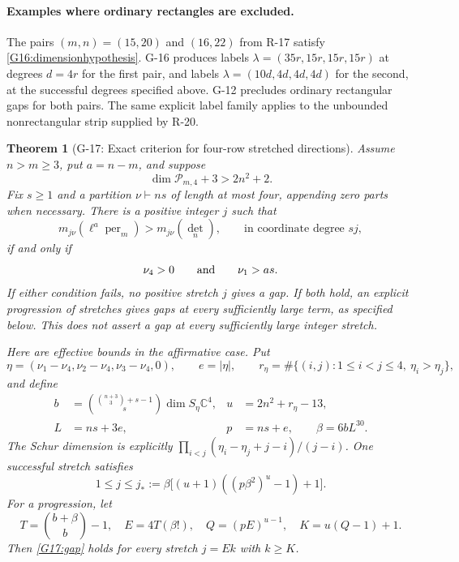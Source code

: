\documentclass[11pt,a4paper]{article}
\newtheorem{theorem}{Theorem}
\theoremstyle{definition}\newtheorem{definition}{Definition}
\begin{document}
\paragraph{Examples where ordinary rectangles are excluded.}
The pairs $(m,n)=(15,20)$ and $(16,22)$ from R-17 satisfy
\eqref{G16:dimensionhypothesis}. G-16 produces labels
$\lambda=(35r,15r,15r,15r)$ at degrees $d=4r$ for the first pair,
and labels $\lambda=(10d,4d,4d,4d)$ for the second, at the
successful degrees specified above. G-12 precludes ordinary
rectangular gaps for both pairs. The same explicit label family
applies to the unbounded nonrectangular strip supplied by R-20.


\begin{theorem}[G-17: Exact criterion for four-row stretched directions]\label{G-17}
Assume $n>m\geq3$, put $a=n-m$, and suppose
\[
 \dim\mathcal P_{m,4}+3>2n^2+2.
\]
Fix $s\geq1$ and a partition $\nu\vdash ns$ of length at most four,
appending zero parts when necessary. There is a positive integer $j$
such that
\begin{equation}\label{G17:gap}
 m_{j\nu}(\ell^a\operatorname{per}_m)>m_{j\nu}(\det_n),
 \qquad\text{in coordinate degree }sj,
\end{equation}
if and only if
\begin{equation}\label{G17:criterion}
 \nu_4>0\qquad\hbox{and}\qquad\nu_1>as.
\end{equation}
If either condition fails, no positive stretch $j$ gives a gap.
If both hold, an explicit progression of stretches gives gaps at
every sufficiently large term, as specified below. This does not
assert a gap at every sufficiently large integer stretch.

Here are effective bounds in the affirmative case. Put
\[
 \eta=(\nu_1-\nu_4,\nu_2-\nu_4,\nu_3-\nu_4,0),\qquad e=|\eta|,
 \qquad r_\eta=\#\{(i,j):1\leq i<j\leq4,\ \eta_i>\eta_j\},
\]
and define
\[
 \begin{aligned}
 b&=\binom{\binom{n+3}{3}+s-1}{s}\dim S_\eta\mathbb C^4,
 &u&=2n^2+r_\eta-13,\\
 L&=ns+3e,&p&=ns+e,\qquad \beta=6bL^{30}.
 \end{aligned}
\]
The Schur dimension is explicitly
$\prod_{i<j}(\eta_i-\eta_j+j-i)/(j-i)$.
One successful stretch satisfies
\begin{equation}\label{G17:firststretch}
 1\leq j\leq
 j_*:=\beta\bigl[(u+1)((p\beta^2)^u-1)+1\bigr].
\end{equation}
For a progression, let
\[
 T=\binom{b+\beta}{b}-1,\quad E=4T(\beta!),\quad
 Q=(pE)^{u-1},\quad K=u(Q-1)+1.
\]
Then \eqref{G17:gap} holds for every stretch $j=Ek$ with $k\geq K$.
\end{theorem}
\end{document}
